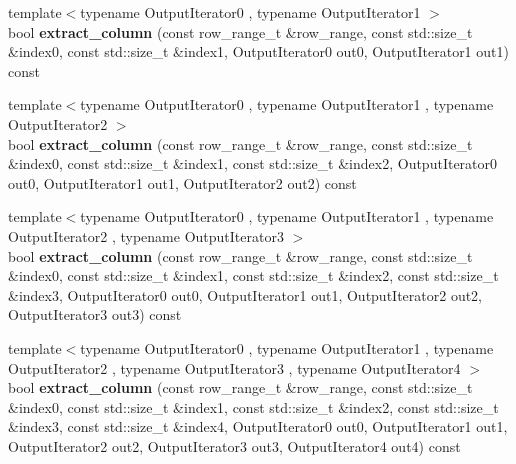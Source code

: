 \begin{DoxyCompactItemize}
\item 
\hypertarget{classstrtk_1_1token__grid_a14748bd5d525cc42e5345730c49b227b}{{\footnotesize template$<$typename Output\-Iterator0 , typename Output\-Iterator1 $>$ }\\bool {\bfseries extract\-\_\-column} (const row\-\_\-range\-\_\-t \&row\-\_\-range, const std\-::size\-\_\-t \&index0, const std\-::size\-\_\-t \&index1, Output\-Iterator0 out0, Output\-Iterator1 out1) const }\label{classstrtk_1_1token__grid_a14748bd5d525cc42e5345730c49b227b}

\item 
\hypertarget{classstrtk_1_1token__grid_a49eb65442baf75ebd88e099fecc17dcd}{{\footnotesize template$<$typename Output\-Iterator0 , typename Output\-Iterator1 , typename Output\-Iterator2 $>$ }\\bool {\bfseries extract\-\_\-column} (const row\-\_\-range\-\_\-t \&row\-\_\-range, const std\-::size\-\_\-t \&index0, const std\-::size\-\_\-t \&index1, const std\-::size\-\_\-t \&index2, Output\-Iterator0 out0, Output\-Iterator1 out1, Output\-Iterator2 out2) const }\label{classstrtk_1_1token__grid_a49eb65442baf75ebd88e099fecc17dcd}

\item 
\hypertarget{classstrtk_1_1token__grid_a13d2710d71c7752dfd45fd37dafe4658}{{\footnotesize template$<$typename Output\-Iterator0 , typename Output\-Iterator1 , typename Output\-Iterator2 , typename Output\-Iterator3 $>$ }\\bool {\bfseries extract\-\_\-column} (const row\-\_\-range\-\_\-t \&row\-\_\-range, const std\-::size\-\_\-t \&index0, const std\-::size\-\_\-t \&index1, const std\-::size\-\_\-t \&index2, const std\-::size\-\_\-t \&index3, Output\-Iterator0 out0, Output\-Iterator1 out1, Output\-Iterator2 out2, Output\-Iterator3 out3) const }\label{classstrtk_1_1token__grid_a13d2710d71c7752dfd45fd37dafe4658}

\item 
\hypertarget{classstrtk_1_1token__grid_a5d782f9012cbd0407d64ab8dcbff0e1b}{{\footnotesize template$<$typename Output\-Iterator0 , typename Output\-Iterator1 , typename Output\-Iterator2 , typename Output\-Iterator3 , typename Output\-Iterator4 $>$ }\\bool {\bfseries extract\-\_\-column} (const row\-\_\-range\-\_\-t \&row\-\_\-range, const std\-::size\-\_\-t \&index0, const std\-::size\-\_\-t \&index1, const std\-::size\-\_\-t \&index2, const std\-::size\-\_\-t \&index3, const std\-::size\-\_\-t \&index4, Output\-Iterator0 out0, Output\-Iterator1 out1, Output\-Iterator2 out2, Output\-Iterator3 out3, Output\-Iterator4 out4) const }\label{classstrtk_1_1token__grid_a5d782f9012cbd0407d64ab8dcbff0e1b}


\end{DoxyCompactItemize}
